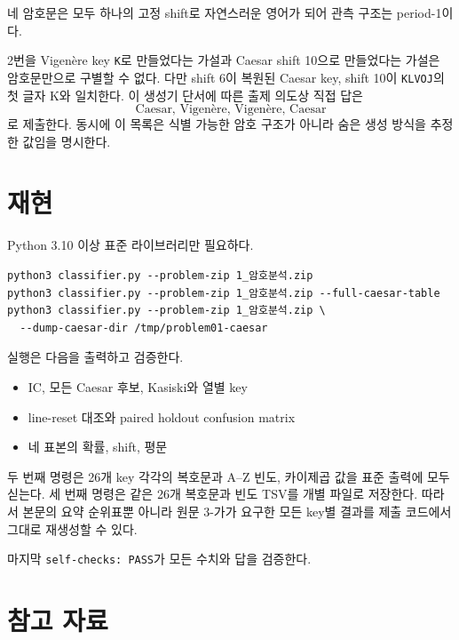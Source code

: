 \documentclass[10pt,a4paper]{article}
\begin{document}
네 암호문은 모두 하나의 고정 shift로 자연스러운 영어가 되어 관측
구조는 period-1이다.

2번을 Vigenère key \texttt{K}로 만들었다는 가설과 Caesar shift
10으로 만들었다는 가설은 암호문만으로 구별할 수 없다. 다만 shift
6이 복원된 Caesar key, shift 10이 \texttt{KLVOJ}의
첫 글자 K와 일치한다. 이 생성기 단서에 따른 출제 의도상 직접 답은
\[
 \boxed{\text{Caesar,\ Vigenère,\ Vigenère,\ Caesar}}
\]
로 제출한다. 동시에 이 목록은 식별 가능한 암호 구조가 아니라 숨은
생성 방식을 추정한 값임을 명시한다.

\section{재현}

Python 3.10 이상 표준 라이브러리만 필요하다.

\begin{lstlisting}
python3 classifier.py --problem-zip 1_암호분석.zip
python3 classifier.py --problem-zip 1_암호분석.zip --full-caesar-table
python3 classifier.py --problem-zip 1_암호분석.zip \
  --dump-caesar-dir /tmp/problem01-caesar
\end{lstlisting}

실행은 다음을 출력하고 검증한다.

\begin{itemize}
  \item IC, 모든 Caesar 후보, Kasiski와 열별 key
  \item line-reset 대조와 paired holdout confusion matrix
  \item 네 표본의 확률, shift, 평문
\end{itemize}

두 번째 명령은 26개 key 각각의 복호문과 A--Z 빈도, 카이제곱 값을
표준 출력에 모두 싣는다. 세 번째 명령은 같은 26개 복호문과 빈도 TSV를
개별 파일로 저장한다. 따라서 본문의 요약 순위표뿐 아니라 원문 3-가가
요구한 모든 key별 결과를 제출 코드에서 그대로 재생성할 수 있다.

마지막 \texttt{self-checks: PASS}가 모든 수치와 답을 검증한다.

\section{참고 자료}
\end{document}
